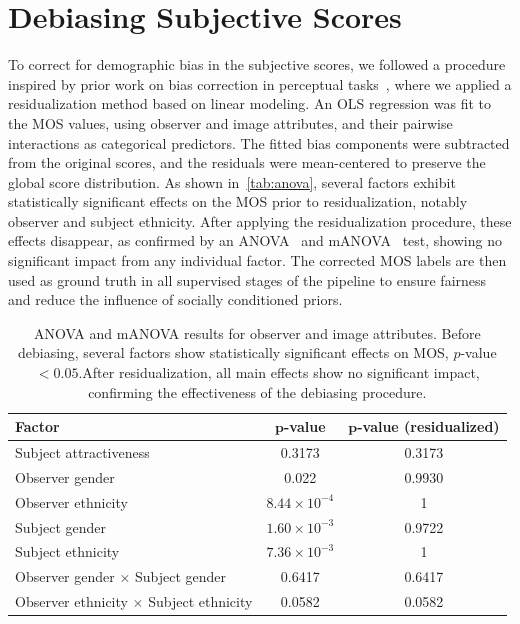 \section{Debiasing Subjective Scores}

To correct for demographic bias in the subjective scores, we followed a procedure inspired by prior work on bias correction in perceptual tasks~\cite{ols}, where we applied a residualization method based on linear modeling. An \acf{OLS} regression was fit to the \acs{MOS} values, using observer and image attributes, and their pairwise interactions as categorical predictors. The fitted bias components were subtracted from the original scores, and the residuals were mean-centered to preserve the global score distribution. As shown in~\autoref{tab:anova}, several factors exhibit statistically significant effects on the \acs{MOS} prior to residualization, notably observer and subject ethnicity. After applying the residualization procedure, these effects disappear, as confirmed by an \acf{ANOVA}~\cite{anova} and \acf{mANOVA}~\cite{manova} test, showing no significant impact from any individual factor. The corrected \acs{MOS} labels are then used as ground truth in all supervised stages of the pipeline to ensure fairness and reduce the influence of socially conditioned priors.

\begin{table}[htbp]
    \centering
    \caption{\acs{ANOVA} and \acs{mANOVA} results for observer and image attributes. Before debiasing, several factors show statistically significant effects on \acs{MOS}, $p$-value $< 0.05$.\@ After residualization, all main effects show no significant impact, confirming the effectiveness of the debiasing procedure.}\label{tab:anova}
    \begin{tabular}{lcc}
        \hline %
        \textbf{Factor} & $\mathbf{p}$-\textbf{value} & $\mathbf{p}$-\textbf{value (residualized)} \\
        \hline %
        Subject attractiveness                      & 0.3173               & 0.3173 \\
        Observer gender                             & 0.022                 & 0.9930 \\
        Observer ethnicity                          & $8.44 \times 10^{-4}$ & 1 \\
        Subject gender                              & $1.60 \times 10^{-3}$ & 0.9722 \\
        Subject ethnicity                           & $7.36 \times 10^{-3}$ & 1 \\
        Observer gender $\times$ Subject gender     & 0.6417              & 0.6417 \\
        Observer ethnicity $\times$ Subject ethnicity & 0.0582              & 0.0582 \\
        \hline %
    \end{tabular}
\end{table}

